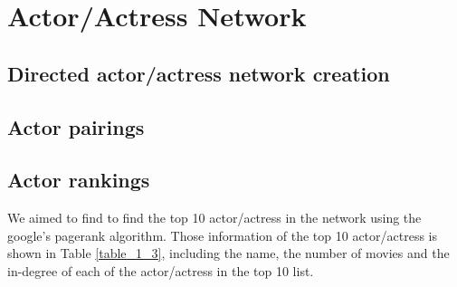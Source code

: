 \documentclass[11pt]{article}
\begin{document}

\section{Actor/Actress Network}

\subsection{Directed actor/actress network creation}

\subsection{Actor pairings}


\subsection{Actor rankings}
We aimed to find to find the top 10 actor/actress in the network using the google’s pagerank algorithm. Those information of the top 10 actor/actress is shown in Table \ref{table_1_3}, including the name, the number of movies and the in-degree of each of the actor/actress in the top 10 list.
\end{document}
